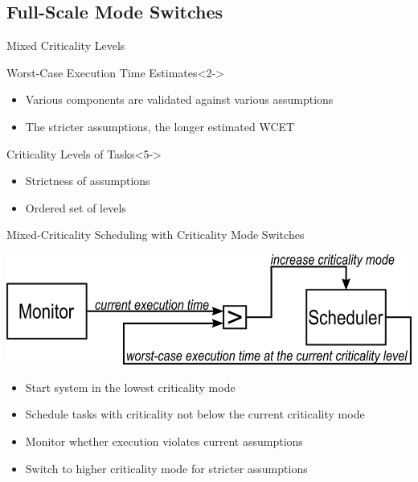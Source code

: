 \subsection{Full-Scale Mode Switches}

\begin{frame}{Mixed Criticality Levels}

\begin{minipage}{\textwidth}
\begin{block}{Worst-Case Execution Time Estimates}<2->
\begin{itemize}
    \item<3-> Various components are validated against various assumptions
    \item<4-> The stricter assumptions, the longer estimated WCET
\end{itemize}
\end{block}

\vfill

\begin{block}{Criticality Levels of Tasks}<5->
\begin{itemize}
    \item<6-> Strictness of assumptions
    \item<7-> Ordered set of levels
\end{itemize}
\end{block}
\end{minipage}

\end{frame}

\begin{frame}{Mixed-Criticality Scheduling with Criticality Mode Switches}

\pause
\includegraphics[width=\textwidth]{Figures/mixed-crit-sched-robin}
\pause
\begin{itemize}[<+->]
    \item Start system in the lowest criticality mode
    \item Schedule tasks with criticality not below the current criticality mode
    \item Monitor whether execution violates current assumptions
    \item Switch to higher criticality mode for stricter assumptions
\end{itemize}

\end{frame}


